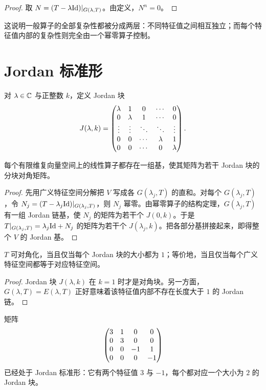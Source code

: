 \begin{proof}
取 $N=(T-\lambda\mathrm{Id})|_{G(\lambda,T)}$。由定义，$N^n=0$。
\end{proof}

\begin{remark}
这说明一般算子的全部复杂性都被分成两层：不同特征值之间相互独立；而每个特征值内部的复杂性则完全由一个幂零算子控制。
\end{remark}

\section{Jordan 标准形}

\begin{definition}
对 $\lambda\in\mathbb{C}$ 与正整数 $k$，定义 Jordan 块
\[
J(\lambda,k)=\begin{pmatrix} 
\lambda&1&0&\cdots&0\\
0&\lambda&1&\cdots&0\\
\vdots&\vdots&\ddots&\ddots&\vdots\\
0&0&\cdots&\lambda&1\\
0&0&\cdots&0&\lambda
 \end{pmatrix}.
\]
\end{definition}

\begin{theorem}
每个有限维复向量空间上的线性算子都存在一组基，使其矩阵为若干 Jordan 块的分块对角矩阵。
\end{theorem}

\begin{proof}
先用广义特征空间分解把 $V$ 写成各 $G(\lambda_j,T)$ 的直和。对每个 $G(\lambda_j,T)$，令 $N_j=(T-\lambda_j\mathrm{Id})|_{G(\lambda_j,T)}$，则 $N_j$ 幂零。由幂零算子的结构定理，$G(\lambda_j,T)$ 有一组 Jordan 链基，使 $N_j$ 的矩阵为若干个 $J(0,k)$。于是 $T|_{G(\lambda_j,T)}=\lambda_j\mathrm{Id}+N_j$ 的矩阵为若干个 $J(\lambda_j,k)$。把各部分基拼接起来，即得整个 $V$ 的 Jordan 基。
\end{proof}

\begin{corollary}
$T$ 可对角化，当且仅当每个 Jordan 块的大小都为 $1$；等价地，当且仅当每个广义特征空间都等于对应特征空间。
\end{corollary}

\begin{proof}
Jordan 块 $J(\lambda,k)$ 在 $k=1$ 时才是对角块。另一方面，$G(\lambda,T)=E(\lambda,T)$ 正好意味着该特征值内部不存在长度大于 $1$ 的 Jordan 链。
\end{proof}

\begin{example}
矩阵
\[
\begin{pmatrix} 3&1&0&0\\0&3&0&0\\0&0&-1&1\\0&0&0&-1 \end{pmatrix}
\]
已经处于 Jordan 标准形：它有两个特征值 $3$ 与 $-1$，每个都对应一个大小为 $2$ 的 Jordan 块。
\end{example}

